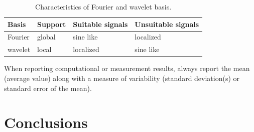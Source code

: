 \documentclass[10pt,conference,compsocconf]{IEEEtran}
\begin{document}
\begin{table}[htbp]
  \centering
  \begin{tabular}[c]{|l||l|l|l|}
    \hline
    Basis&Support&Suitable signals&Unsuitable signals\\
    \hline
    Fourier&global&sine like&localized\\
    wavelet&local&localized&sine like\\
    \hline
  \end{tabular}
  \caption{Characteristics of Fourier and wavelet basis.}
  \label{tab:fourier-wavelet}
\end{table}

When reporting computational or measurement results, always
report the mean (average value) along with a measure of variability
(standard deviation(s) or standard error of the mean).







\section{Conclusions}
\label{sec:conclusions}






\end{document}
